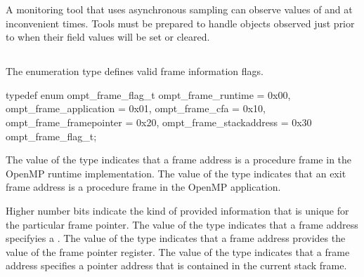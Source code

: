 \begin{note}
A monitoring tool that uses asynchronous sampling can observe values
of  and  at inconvenient times.
Tools must be prepared to handle  objects observed 
just prior to when their field values will be set or cleared.
\end{note}



\subsection{}
\label{subsubsec:ompt_frame_flag_t}

\summary
The  enumeration type defines valid frame 
information flags.

\syntax
\begin{ccppspecific}
\begin{ompSyntax}
typedef enum ompt_frame_flag_t {
  ompt_frame_runtime        = 0x00,
  ompt_frame_application    = 0x01,
  ompt_frame_cfa            = 0x10,
  ompt_frame_framepointer   = 0x20,
  ompt_frame_stackaddress   = 0x30
} ompt_frame_flag_t; 
\end{ompSyntax}
\end{ccppspecific}

\descr
The value  of the  type
indicates that a frame address is a procedure frame in the OpenMP runtime 
implementation. The value  of the 
 type indicates that an exit frame address is a 
procedure frame in the OpenMP application.

Higher number bits indicate the kind of provided information that is unique
for the particular frame pointer. The value  of the 
 type indicates that a frame address specifyies
a . The value  
of the  type indicates that a frame address 
provides the value of the frame pointer register. The value 
 of the  type
indicates that a frame address specifies a pointer address that is
contained in the current stack frame.
